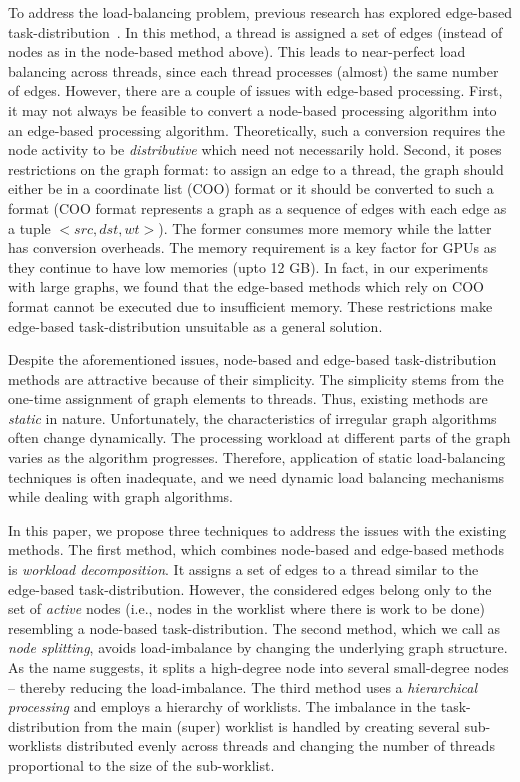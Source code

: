 To address the load-balancing problem, previous research has explored edge-based task-distribution~\cite{sariyuce-bc-gpgpu2013}.
In this method, a thread is assigned a set of edges (instead of nodes as in the node-based method above).
This leads to near-perfect load balancing across threads, since each thread processes (almost) the same number of edges.
However, there are a couple of issues with edge-based processing.
First, it may not always be feasible to convert a node-based processing algorithm into an edge-based processing algorithm.
Theoretically, such a conversion requires the node activity to be \textit{distributive} which need not necessarily hold.
Second, it poses restrictions on the graph format: to assign an edge to a thread, the graph should either be in a coordinate list (COO) format or it should be converted to such a format
(COO format represents a graph as a sequence of edges with each edge as a tuple $<src, dst, wt>$).
The former consumes more memory while the latter has conversion overheads.
The memory requirement is a key factor for GPUs as they continue to have low memories (upto 12 GB).
In fact, in our experiments with large graphs, we found that the edge-based methods which rely on COO format cannot be executed due to insufficient memory.
These restrictions make edge-based task-distribution unsuitable as a general solution.

Despite the aforementioned issues, node-based and edge-based task-distribution methods are attractive because of their simplicity.
The simplicity stems from the one-time assignment of graph elements to threads.
Thus, existing methods are \textit{static} in nature.
Unfortunately, the characteristics of irregular graph algorithms often change dynamically.
The processing workload at different parts of the graph varies as the algorithm progresses.
Therefore, application of static load-balancing techniques is often inadequate, and
we need dynamic load balancing mechanisms while dealing with graph algorithms.

In this paper, we propose three techniques to address the issues with the existing methods.
The first method, which combines node-based and edge-based methods is \textit{workload decomposition}. 
It assigns a set of edges to a thread similar to the edge-based task-distribution.
However, the considered edges belong only to the set of \textit{active} nodes (i.e., nodes in the worklist where there is work to be done) resembling a node-based task-distribution.
The second method, which we call as \textit{node splitting}, avoids load-imbalance by changing the underlying graph structure.
As the name suggests, it splits a high-degree node into several small-degree nodes -- thereby reducing the load-imbalance.
The third method uses a \textit{hierarchical processing} and employs a hierarchy of worklists.
The imbalance in the task-distribution from the main (super) worklist is handled by creating several sub-worklists distributed evenly across threads and changing the number of threads proportional to the size of the sub-worklist.


